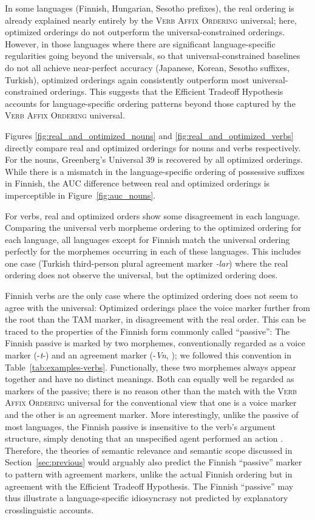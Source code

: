 \documentclass[man]{apa7}
\newcommand{\citep}{\parencite}
\newcommand{\citet}{\Textcite}
\begin{document}
In some languages (Finnish, Hungarian, Sesotho prefixes), the real ordering is already explained nearly entirely by the \textsc{Verb Affix Ordering} universal; here, optimized orderings do not outperform the universal-constrained orderings.
However, in those languages where  there are significant language-specific regularities going beyond the universals, so that universal-constrained baselines do not all achieve near-perfect accuracy (Japanese, Korean, Sesotho suffixes, Turkish), optimized orderings again consistently outperform most universal-constrained orderings.
This suggests that the Efficient Tradeoff Hypothesis accounts for language-specific ordering patterns beyond those captured by the \textsc{Verb Affix Ordering} universal.


Figures \ref{fig:real_and_optimized_nouns} and \ref{fig:real_and_optimized_verbs} directly compare real and optimized orderings for nouns and verbs respectively.
For the nouns, Greenberg's Universal 39 is recovered by all optimized orderings.
While there is a mismatch in the language-specific ordering of possessive suffixes in Finnish, the AUC difference between real and optimized orderings is imperceptible in Figure~\ref{fig:auc_nouns}.

For verbs, real and optimized orders show some disagreement in each language.
Comparing the universal verb morpheme ordering to the optimized ordering for each language, all languages except for Finnish match the universal ordering perfectly for the morphemes occurring in each of these languages.
This includes one case (Turkish third-person plural agreement marker \textit{-lar}) where the real ordering does not observe the universal, but the optimized ordering does.

Finnish verbs are the only case where the optimized ordering does not seem to agree with the universal: Optimized orderings place the voice marker further from the root than the TAM marker, in disagreement with the real order.
This can be traced to the properties of the Finnish form commonly called ``passive'':
The Finnish passive is marked by two morphemes, conventionally regarded as a voice marker (-\textit{t}-) and an agreement marker (-\textit{Vn}, \citet[Section 69]{karlsson1999finnish}); we followed this convention in Table~\ref{tab:examples-verbs}.
Functionally, these two morphemes always appear together and have no distinct meanings.
Both can equally well be regarded as markers of the passive; there is no reason other than the match with the \textsc{Verb Affix Ordering} universal for the conventional view that one is a voice marker and the other is an agreement marker.
More interestingly, unlike the passive of most languages, the Finnish passive is insensitive to the verb's argument structure, simply denoting that an unspecified agent performed an action \citep{Shore1988OnTS,Blevins2003PassivesAI}.
Therefore, the theories of semantic relevance and semantic scope discussed in Section~\ref{sec:previous} would arguably also predict the Finnish ``passive'' marker to pattern with agreement markers, unlike the actual Finnish ordering but in agreement with the Efficient Tradeoff Hypothesis.
The Finnish ``passive'' may thus illustrate a language-specific idiosyncrasy not predicted by explanatory crosslinguistic accounts.
\end{document}
